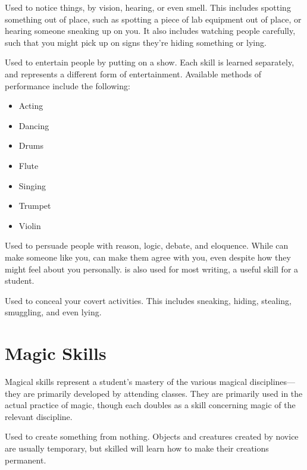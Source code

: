 
Used to notice things, by vision, hearing, or even smell.
This includes spotting something out of place, such as spotting a piece of lab equipment out of place, or hearing someone sneaking up on you.
It also includes watching people carefully, such that you might pick up on signs they're hiding something or lying.


Used to entertain people by putting on a show.
Each  skill is learned separately, and represents a different form of entertainment.
Available methods of performance include the following:
\begin{itemize}
	\item Acting
	\item Dancing
	\item Drums
	\item Flute
	\item Singing
	\item Trumpet
	\item Violin
\end{itemize}


Used to persuade people with reason, logic, debate, and eloquence.
While  can make someone like you,  can make them agree with you, even despite how they might feel about you personally.
 is also used for most writing, a useful skill for a student.


Used to conceal your covert activities.
This includes sneaking, hiding, stealing, smuggling, and even lying.

\section{Magic Skills}

Magical skills represent a student's mastery of the various magical disciplines---they are primarily developed by attending classes.
They are primarily used in the actual practice of magic, though each doubles as a  skill concerning magic of the relevant discipline.


Used to create something from nothing.
Objects and creatures created by novice  are usually temporary, but skilled  will learn how to make their creations permanent.

